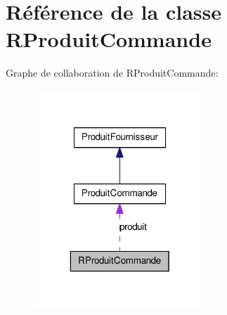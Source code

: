 \hypertarget{class_r_produit_commande}{
\section{Référence de la classe RProduitCommande}
\label{d3/d2d/class_r_produit_commande}
}


Graphe de collaboration de RProduitCommande:\nopagebreak
\begin{figure}[H]
\begin{center}
\leavevmode
\includegraphics[width=184pt]{d0/d18/class_r_produit_commande__coll__graph}
\end{center}
\end{figure}
